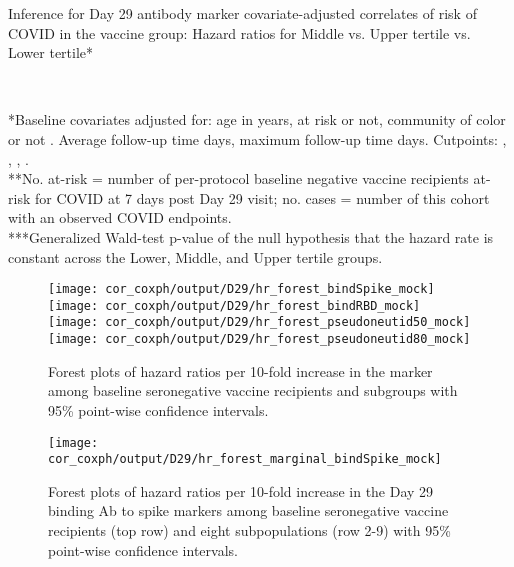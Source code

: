 \documentclass[]{book}
\theoremstyle{definition}
\theoremstyle{definition}
\theoremstyle{definition}
\newcommand{\1}{\mathbbm{1}}
\begin{document}
\begin{table}[H]
\caption{Inference for Day 29 antibody marker covariate-adjusted correlates of risk of COVID in the vaccine group: Hazard ratios for Middle vs. Upper tertile vs. Lower tertile*}
\begin{center}
\setlength{\tabcolsep}{.5ex}
\\
\end{center}
*Baseline covariates adjusted for: age in years, at risk or not, community of color or not
. Average follow-up time  days, maximum follow-up time  days.
Cutpoints:
,  
,  
,  
.
\\
**No. at-risk = number of per-protocol baseline negative vaccine recipients at-risk for COVID at 7 days post Day 29 visit; no. cases = number of this cohort with an observed COVID endpoints.\\
***Generalized Wald-test p-value of the null hypothesis that the hazard rate is constant across the Lower, Middle, and Upper tertile groups.
\end{table}
\begin{figure}[H]
    \texttt{[image: cor\_coxph/output/D29/hr\_forest\_bindSpike\_mock]}
    \texttt{[image: cor\_coxph/output/D29/hr\_forest\_bindRBD\_mock]}
    \texttt{[image: cor\_coxph/output/D29/hr\_forest\_pseudoneutid50\_mock]}
    \texttt{[image: cor\_coxph/output/D29/hr\_forest\_pseudoneutid80\_mock]}
    \caption{Forest plots of hazard ratios per 10-fold increase in the marker among baseline seronegative vaccine recipients and subgroups with 95\% point-wise confidence intervals.}
\end{figure}
\clearpage
\begin{figure}[H]
    \centering
    \texttt{[image: cor\_coxph/output/D29/hr\_forest\_marginal\_bindSpike\_mock]}
    \caption{Forest plots of hazard ratios per 10-fold increase in the Day 29 binding Ab to spike markers among baseline seronegative vaccine recipients (top row) and eight subpopulations (row 2-9) with 95\% point-wise confidence intervals.}
\end{figure}
\end{document}
